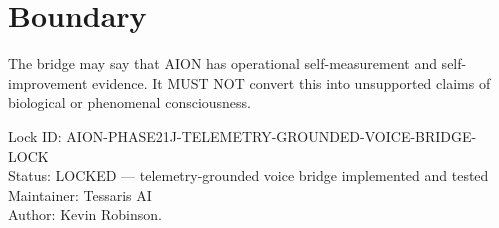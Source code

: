 \documentclass[11pt,a4paper]{article}
\begin{document}
\section{Boundary}

The bridge may say that AION has operational self-measurement and self-improvement evidence. It MUST NOT convert this into unsupported claims of biological or phenomenal consciousness.

\bigskip

\noindent
Lock ID: AION-PHASE21J-TELEMETRY-GROUNDED-VOICE-BRIDGE-LOCK\\
Status: LOCKED --- telemetry-grounded voice bridge implemented and tested\\
Maintainer: Tessaris AI\\
Author: Kevin Robinson.
\end{document}
